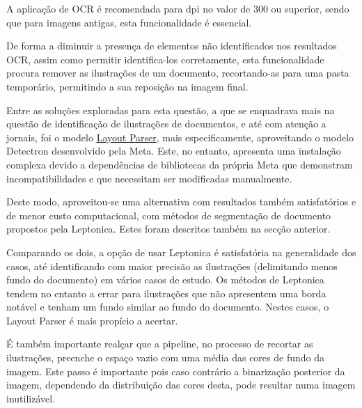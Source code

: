 A aplicação de OCR é recomendada para dpi no valor de 300 ou superior, sendo que para imagens antigas, esta funcionalidade é essencial.




De forma a diminuir a presença de elementos não identificados nos resultados OCR, assim como permitir identifica-los corretamente, esta funcionalidade procura remover as ilustrações de um documento, recortando-as para uma pasta temporário, permitindo a sua reposição na imagem final.

Entre as soluções exploradas para esta questão, a que se enquadrava mais na questão de identificação de ilustrações de documentos, e até com atenção a jornais, foi o modelo \href{https://layout-parser.readthedocs.io/en/latest/index.html}{Layout Parser}, mais especificamente, aproveitando o modelo Detectron desenvolvido pela Meta.
Este, no entanto, apresenta uma instalação complexa devido a dependências de bibliotecas da própria Meta que demonstram incompatibilidades e que necessitam ser modificadas manualmente.

Deste modo, aproveitou-se uma alternativa com resultados também satisfatórios e de menor custo computacional, com métodos de segmentação de documento propostos pela Leptonica. Estes foram descritos também na secção anterior.

Comparando os dois, a opção de usar Leptonica é satisfatória na generalidade dos casos, até identificando com maior precisão as ilustrações (delimitando menos fundo do documento) em vários casos de estudo. Os métodos de Leptonica tendem no entanto a errar para ilustrações que não apresentem uma borda notável e tenham um fundo similar ao fundo do documento. Nestes casos, o Layout Parser é mais propício a acertar.


É também importante realçar que a pipeline, no processo de recortar as ilustrações, preenche o espaço vazio com uma média das cores de fundo da imagem. Este passo é importante pois caso contrário a binarização posterior da imagem, dependendo da distribuição das cores desta, pode resultar numa imagem inutilizável.



